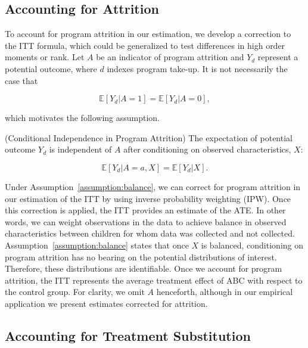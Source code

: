 \subsection{Accounting for Attrition}

\noindent To account for program attrition in our estimation, we develop a correction to the ITT formula, which could be generalized to test differences in high order moments or rank. Let $A$ be an indicator of program attrition and $Y_{d} $ represent a potential outcome, where $d$ indexes program take-up. It is not necessarily the case that 

\begin{equation}
\mathbb{E} \left[ Y_{d} |  A = 1 \right]  = \mathbb{E} \left[ Y_{d} | A = 0  \right],
\end{equation}

\noindent which motivates the following assumption. 

\begin{assumption} \normalfont \label{assumption:balance} (Conditional Independence in Program Attrition) The expectation of potential outcome $Y_{d}$ is independent of $A$ after conditioning on observed characteristics, $X$: 

\begin{equation}
\mathbb{E} \left[ Y_{d} | A = a, X \right] = \mathbb{E} \left[ Y_{d} | X \right].
\end{equation}

\end{assumption}

\noindent Under Assumption~\ref{assumption:balance}, we can correct for program attrition in our estimation of the ITT by using inverse probability weighting (IPW). Once this correction is applied, the ITT provides an estimate of the ATE. In other words, we can weight observations in the data to achieve balance in observed characteristics between children for whom data was collected and not collected. Assumption~\ref{assumption:balance} states that once $X$ is balanced, conditioning on program attrition has no bearing on the potential distributions of interest. Therefore, these distributions are identifiable. Once we account for program attrition, the ITT represents the average treatment effect of ABC with respect to the control group. For clarity, we omit $A$ henceforth, although in our empirical application we present estimates corrected for attrition.\\

\subsection{Accounting for Treatment Substitution}

